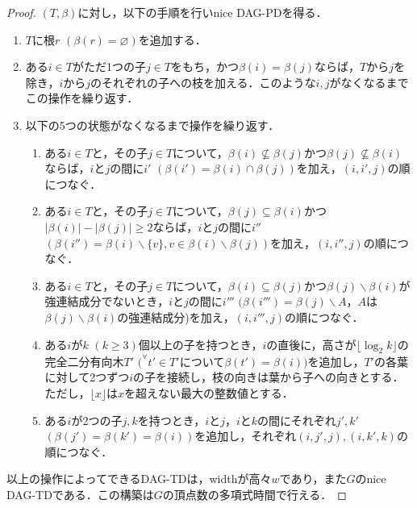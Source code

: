 \documentclass[master]{kuisthesis}		%
\theoremstyle{plain}
\theoremstyle{definition}
\begin{document}
\begin{proof}
    $(T, \beta)$に対し，以下の手順を行いnice DAG-PDを得る．

    \begin{enumerate}
        \item $T$に根$r$ $(\beta(r) = \varnothing)$を追加する．
        \item ある$i \in T$がただ1つの子$j \in T$をもち，かつ$\beta(i) = \beta(j)$ならば，$T$から$j$を除き，$i$から$j$のそれぞれの子への枝を加える．このような$i, j$がなくなるまでこの操作を繰り返す．
        \item 以下の5つの状態がなくなるまで操作を繰り返す．
        \begin{enumerate}
            \item ある$i \in T$と，その子$j \in T$について，$\beta(i) \nsubseteq \beta(j)$かつ$\beta(j) \nsubseteq \beta(i)$ならば，$i$と$j$の間に$i'$ $(\beta(i') = \beta(i) \cap \beta(j))$を加え，$(i, i', j)$の順につなぐ．
            \item ある$i \in T$と，その子$j \in T$について，$\beta(j) \subseteq \beta(i)$かつ$|\beta(i)| - |\beta(j)| \geq 2$ならば，$i$と$j$の間に$i''$ $(\beta(i'') = \beta(i) \backslash \{v\}, v \in \beta(i) \backslash \beta(j))$を加え，$(i, i'', j)$の順につなぐ．
            \item ある$i \in T$と，その子$j \in T$について，$\beta(i) \subseteq \beta(j)$かつ$\beta(j) \backslash \beta(i)$が強連結成分でないとき，$i$と$j$の間に$i'''$ $(\beta(i''') = \beta(j) \backslash A$，$A$は$\beta(j) \backslash \beta(i)$の強連結成分)を加え，$(i, i''', j)$の順につなぐ．
            \item ある$i$が$k$ $(k \geq 3)$個以上の子を持つとき，$i$の直後に，高さが$\lfloor \log_{2} k \rfloor$の完全二分有向木$T'$ $(^{\forall}t' \in T'$について$\beta(t') = \beta(i))$を追加し，$T'$の各葉に対して2つずつ$i$の子を接続し，枝の向きは葉から子への向きとする．ただし，$\lfloor x \rfloor$は$x$を超えない最大の整数値とする．
            \item ある$i$が2つの子$j, k$を持つとき，$i$と$j$，$i$と$k$の間にそれぞれ$j', k'$ $(\beta(j') = \beta(k') = \beta(i))$を追加し，それぞれ$(i, j', j), (i, k', k)$の順につなぐ．
        \end{enumerate}
    \end{enumerate}

    以上の操作によってできるDAG-TDは，widthが高々$w$であり，また$G$のnice DAG-TDである．この構築は$G$の頂点数の多項式時間で行える．
\end{proof}
\end{document}
